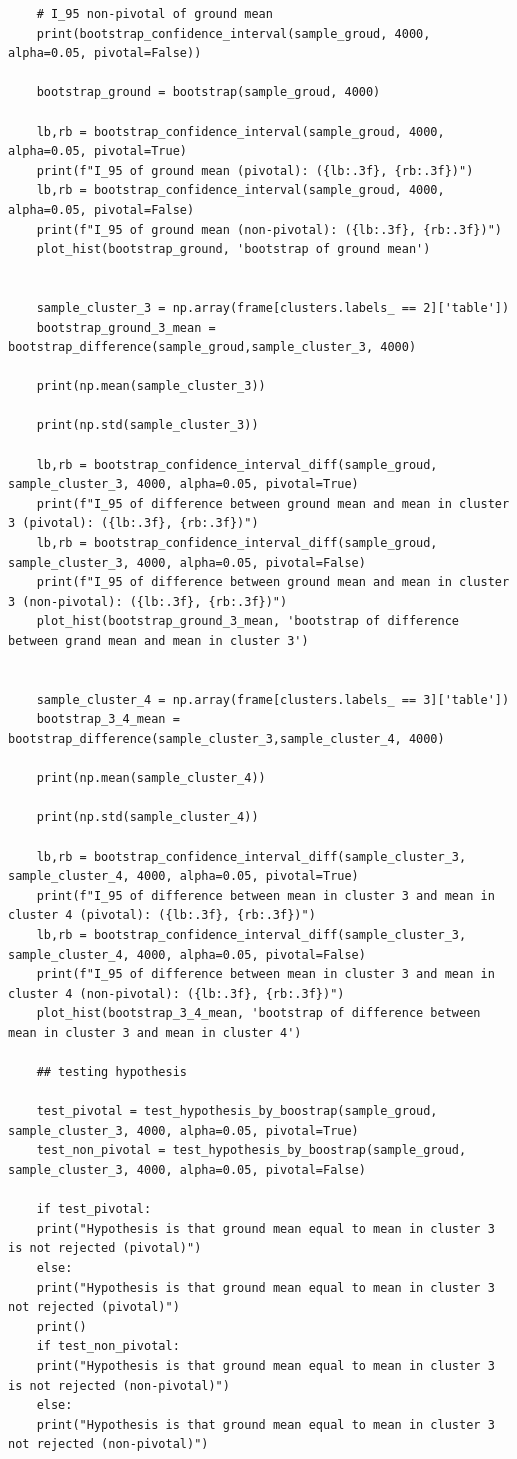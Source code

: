 \documentclass[12pt,a4paper]{article}
\begin{document}
\begin{lstlisting}
	# I_95 non-pivotal of ground mean
	print(bootstrap_confidence_interval(sample_groud, 4000, alpha=0.05, pivotal=False))
	
	bootstrap_ground = bootstrap(sample_groud, 4000)
	
	lb,rb = bootstrap_confidence_interval(sample_groud, 4000, alpha=0.05, pivotal=True)
	print(f"I_95 of ground mean (pivotal): ({lb:.3f}, {rb:.3f})")
	lb,rb = bootstrap_confidence_interval(sample_groud, 4000, alpha=0.05, pivotal=False)
	print(f"I_95 of ground mean (non-pivotal): ({lb:.3f}, {rb:.3f})")
	plot_hist(bootstrap_ground, 'bootstrap of ground mean')
	
	
	sample_cluster_3 = np.array(frame[clusters.labels_ == 2]['table'])
	bootstrap_ground_3_mean = bootstrap_difference(sample_groud,sample_cluster_3, 4000)
	
	print(np.mean(sample_cluster_3))
	
	print(np.std(sample_cluster_3))
	
	lb,rb = bootstrap_confidence_interval_diff(sample_groud, sample_cluster_3, 4000, alpha=0.05, pivotal=True)
	print(f"I_95 of difference between ground mean and mean in cluster 3 (pivotal): ({lb:.3f}, {rb:.3f})")
	lb,rb = bootstrap_confidence_interval_diff(sample_groud, sample_cluster_3, 4000, alpha=0.05, pivotal=False)
	print(f"I_95 of difference between ground mean and mean in cluster 3 (non-pivotal): ({lb:.3f}, {rb:.3f})")
	plot_hist(bootstrap_ground_3_mean, 'bootstrap of difference between grand mean and mean in cluster 3')
	
	
	sample_cluster_4 = np.array(frame[clusters.labels_ == 3]['table'])
	bootstrap_3_4_mean = bootstrap_difference(sample_cluster_3,sample_cluster_4, 4000)
	
	print(np.mean(sample_cluster_4))
	
	print(np.std(sample_cluster_4))
	
	lb,rb = bootstrap_confidence_interval_diff(sample_cluster_3, sample_cluster_4, 4000, alpha=0.05, pivotal=True)
	print(f"I_95 of difference between mean in cluster 3 and mean in cluster 4 (pivotal): ({lb:.3f}, {rb:.3f})")
	lb,rb = bootstrap_confidence_interval_diff(sample_cluster_3, sample_cluster_4, 4000, alpha=0.05, pivotal=False)
	print(f"I_95 of difference between mean in cluster 3 and mean in cluster 4 (non-pivotal): ({lb:.3f}, {rb:.3f})")
	plot_hist(bootstrap_3_4_mean, 'bootstrap of difference between mean in cluster 3 and mean in cluster 4')
	
	## testing hypothesis
	
	test_pivotal = test_hypothesis_by_boostrap(sample_groud, sample_cluster_3, 4000, alpha=0.05, pivotal=True)
	test_non_pivotal = test_hypothesis_by_boostrap(sample_groud, sample_cluster_3, 4000, alpha=0.05, pivotal=False)
	
	if test_pivotal:
	print("Hypothesis is that ground mean equal to mean in cluster 3 is not rejected (pivotal)")
	else:
	print("Hypothesis is that ground mean equal to mean in cluster 3 not rejected (pivotal)")
	print()
	if test_non_pivotal:
	print("Hypothesis is that ground mean equal to mean in cluster 3 is not rejected (non-pivotal)")
	else:
	print("Hypothesis is that ground mean equal to mean in cluster 3 not rejected (non-pivotal)")
	\end{lstlisting}	
\end{document}
